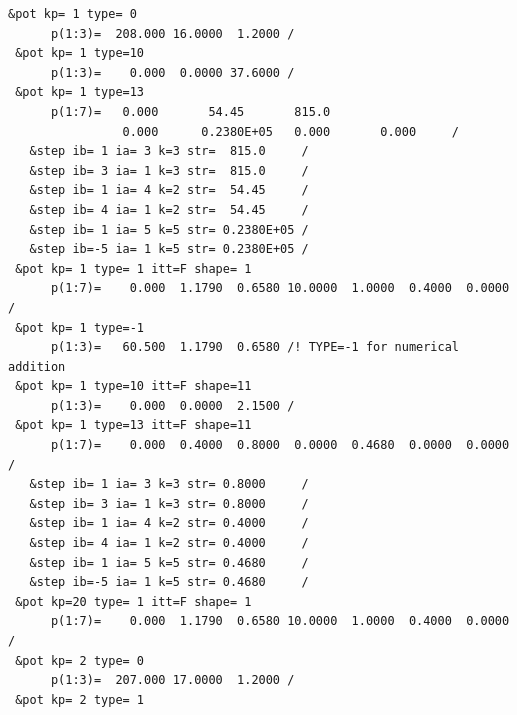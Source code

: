 \documentclass[11pt]{book}
\begin{document}
\begin{small}
\begin{lstlisting}[frame=single]
 &pot kp= 1 type= 0                                                             
      p(1:3)=  208.000 16.0000  1.2000 /                                        
 &pot kp= 1 type=10                                                             
      p(1:3)=    0.000  0.0000 37.6000 /                                        
 &pot kp= 1 type=13                                                             
      p(1:7)=   0.000       54.45       815.0                                   
                0.000      0.2380E+05   0.000       0.000     /                 
   &step ib= 1 ia= 3 k=3 str=  815.0     /                                      
   &step ib= 3 ia= 1 k=3 str=  815.0     /                                      
   &step ib= 1 ia= 4 k=2 str=  54.45     /                                      
   &step ib= 4 ia= 1 k=2 str=  54.45     /                                      
   &step ib= 1 ia= 5 k=5 str= 0.2380E+05 /                                      
   &step ib=-5 ia= 1 k=5 str= 0.2380E+05 /                                      
 &pot kp= 1 type= 1 itt=F shape= 1                                              
      p(1:7)=    0.000  1.1790  0.6580 10.0000  1.0000  0.4000  0.0000 /        
 &pot kp= 1 type=-1                                                             
      p(1:3)=   60.500  1.1790  0.6580 /! TYPE=-1 for numerical addition                       
 &pot kp= 1 type=10 itt=F shape=11                                              
      p(1:3)=    0.000  0.0000  2.1500 /                                        
 &pot kp= 1 type=13 itt=F shape=11                                              
      p(1:7)=    0.000  0.4000  0.8000  0.0000  0.4680  0.0000  0.0000 /        
   &step ib= 1 ia= 3 k=3 str= 0.8000     /                                      
   &step ib= 3 ia= 1 k=3 str= 0.8000     /                                      
   &step ib= 1 ia= 4 k=2 str= 0.4000     /                                      
   &step ib= 4 ia= 1 k=2 str= 0.4000     /                                      
   &step ib= 1 ia= 5 k=5 str= 0.4680     /                                      
   &step ib=-5 ia= 1 k=5 str= 0.4680     /                                      
 &pot kp=20 type= 1 itt=F shape= 1                                              
      p(1:7)=    0.000  1.1790  0.6580 10.0000  1.0000  0.4000  0.0000 /        
 &pot kp= 2 type= 0                                                             
      p(1:3)=  207.000 17.0000  1.2000 /                                        
 &pot kp= 2 type= 1                                                             

\end{lstlisting}
\end{small}
\end{document}
